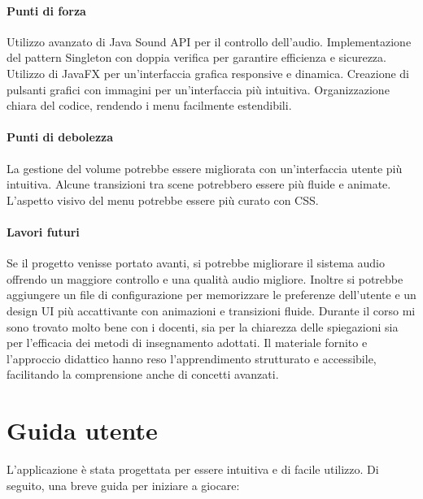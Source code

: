 \documentclass[a4paper,12pt]{report}
\begin{document}
\subsubsection{Punti di forza}
Utilizzo avanzato di Java Sound API per il controllo dell’audio.
Implementazione del pattern Singleton con doppia verifica per garantire efficienza e sicurezza.
Utilizzo di JavaFX per un'interfaccia grafica responsive e dinamica.
Creazione di pulsanti grafici con immagini per un’interfaccia più intuitiva.
Organizzazione chiara del codice, rendendo i menu facilmente estendibili.
\subsubsection{Punti di debolezza}
La gestione del volume potrebbe essere migliorata con un'interfaccia utente più intuitiva.
Alcune transizioni tra scene potrebbero essere più fluide e animate.
L’aspetto visivo del menu potrebbe essere più curato con CSS.
\subsubsection{Lavori futuri}
Se il progetto venisse portato avanti, si potrebbe migliorare il sistema audio offrendo un maggiore controllo e una qualità audio migliore. Inoltre si potrebbe aggiungere un file di configurazione per memorizzare le preferenze dell’utente e un design UI più accattivante con animazioni e transizioni fluide.
Durante il corso mi sono trovato molto bene con i docenti, sia per la chiarezza delle spiegazioni sia per l’efficacia dei metodi di insegnamento adottati. Il materiale fornito e l’approccio didattico hanno reso l’apprendimento strutturato e accessibile, facilitando la comprensione anche di concetti avanzati.

\appendix
\chapter{Guida utente}

L'applicazione è stata progettata per essere intuitiva e di facile utilizzo. Di seguito, una breve guida per iniziare a giocare:
\end{document}
